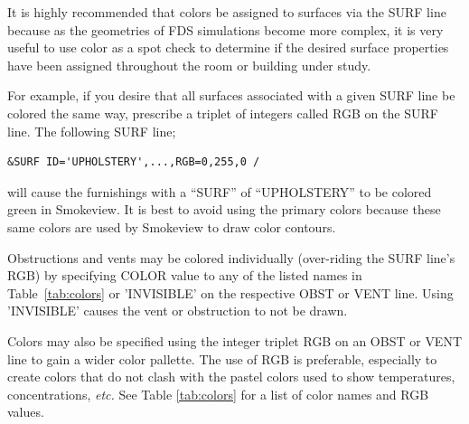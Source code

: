 \documentclass[11pt]{book}
\begin{document}
It is highly recommended that colors be assigned to surfaces via the {\ct SURF} line because as
the geometries of FDS simulations become more complex, it is very useful
to use color as a spot check to determine if the desired
surface properties have been assigned throughout the room or building under study.

For example, if you desire that all surfaces associated with a
given {\ct SURF} line be colored the same way, prescribe a triplet of
integers called {\ct RGB} on the {\ct SURF} line. The following {\ct SURF} line;
\footnotesize
\begin{verbatim}
&SURF ID='UPHOLSTERY',...,RGB=0,255,0 /
\end{verbatim}
\normalsize
will cause the furnishings with a ``SURF'' of ``UPHOLSTERY'' to be colored green in Smokeview.
It is best to avoid using the primary colors because these same colors are
used by Smokeview to draw color contours.

Obstructions and vents may be colored individually (over-riding the
{\ct SURF} line's {\ct RGB}) by specifying {\ct COLOR} value to any of
the listed names in Table~\ref{tab:colors} or {\ct 'INVISIBLE'} on
the respective {\ct OBST} or {\ct VENT} line. Using {\ct 'INVISIBLE'}
causes the vent or obstruction to not be drawn.

Colors may also be specified using the integer triplet {\ct RGB} on an {\ct OBST} or {\ct VENT} line to gain
a wider color pallette. The use of {\ct RGB} is preferable, especially
to create colors that do not clash with the pastel colors used to
show temperatures, concentrations, {\em etc.} See Table \ref{tab:colors}
for a list of color names and RGB values.
\end{document}
